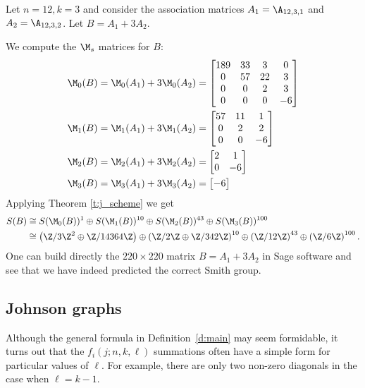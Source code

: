 \begin{example}\label{ex:scheme}
Let $n=12, k=3$ and consider the association matrices $A_1 = \A_{12,3,1}$ and $A_2 = \A_{12,3,2}$.  Let $B = A_1 + 3A_2$.

We compute the $\M_{s}$ matrices for $B$:
\begin{align*}
\M_{0}(B) &= \M_{0}(A_1) + 3\M_{0}(A_2) = \begin{bmatrix}
    189 & 33 & 3 & 0\\
    0 & 57 & 22 & 3\\
    0 & 0 & 2 & 3\\
    0 & 0 & 0 & -6
\end{bmatrix} \\
\M_{1}(B) &= \M_{1}(A_1) + 3\M_{1}(A_2) = \begin{bmatrix}
    57 & 11 & 1\\
    0 & 2 & 2\\
    0 & 0 & -6
\end{bmatrix}\\
\M_{2}(B) &= \M_{2}(A_1) + 3\M_{2}(A_2) = \begin{bmatrix}
    2 & 1\\
    0 & -6
\end{bmatrix} \\
\M_{3}(B) &= \M_{3}(A_1) + 3\M_{3}(A_2) = \begin{bmatrix}
    -6
\end{bmatrix}
\end{align*}
Applying Theorem \ref{t:j_scheme} we get
\begin{align*}
S(B) &\cong S(\M_{0}(B))^{1} \oplus S(\M_{1}(B))^{10} \oplus S(\M_{2}(B))^{43} \oplus S(\M_{3}(B))^{100}\\
&\cong \left ( \Z/3\Z^{2} \oplus \Z/14364\Z \right )
\oplus \left ( \Z/2\Z \oplus \Z/342\Z \right )^{10} 
\oplus \left ( \Z/12\Z \right )^{43}
\oplus \left ( \Z/6\Z \right )^{100}.
\end{align*}
One can build directly the $220 \times 220$ matrix $B = A_{1} + 3A_{2}$ in Sage software \cite{sagemath} and see that we have indeed predicted the correct Smith group.
\end{example}


\subsection{Johnson graphs}

Although the general formula in Definition~\ref{d:main} may seem formidable, it turns out that the $f_i(j; n, k, \ell)$ summations often have a simple form for particular values of $\ell$.  For example, there are only two non-zero diagonals in the case when $\ell = k-1$.

